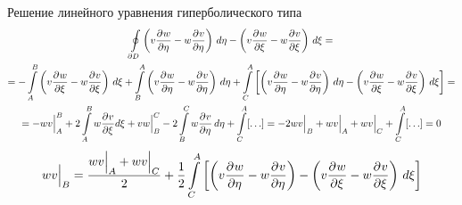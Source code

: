 \begin{example}{Решение линейного уравнения гиперболического типа}
\begin{multline*}
	\oint\limits_{\partial D}  \left(v \frac{\partial^{}w}{\partial \eta^{}} - w \frac{\partial^{}v}{\partial \eta^{}} \right) \, d\eta - \left(v \frac{\partial^{}w}{\partial \xi^{}} - w \frac{\partial^{}v}{\partial \xi^{}}\right)\, d\xi = \\ 
	= - \int\limits_A^B \left(v \frac{\partial^{}w}{\partial \xi^{}} - w \frac{\partial^{}v}{\partial \xi^{}} \right)\, d\xi + \int\limits_B^A \left(v \frac{\partial^{}w}{\partial \eta^{}} - w \frac{\partial^{}v}{\partial \eta^{}} \right)\, d\eta + \int\limits_C^A \left[\left(v \frac{\partial^{}w}{\partial \eta^{}} - w \frac{\partial^{}v}{\partial \eta^{}} \right)\, d\eta - \left(v \frac{\partial^{}w}{\partial \xi^{}} - w \frac{\partial^{}v}{\partial \xi^{}} \right)\, d\xi \right] = \\
	= - wv \Big|_A^B + 2 \int\limits_A^B w \frac{\partial^{}v}{\partial \xi^{}} d \xi + v w \Big|_B^C - 2 \int\limits_B^C w \frac{\partial^{}v}{\partial \eta^{}}\, d\eta + \int\limits_C^A [\ldots] = -2 w v\Big|_B + w v\Big|_A + w v\Big|_C + \int\limits_C^A [\ldots] = 0
\end{multline*}
\[
	w v\Big|_B = \frac{wv\Big|_A + w v\Big|_C}{2} + \frac{1}{2} \int\limits_C^A \left[ \left(v \frac{\partial^{}w}{\partial \eta^{}} - w \frac{\partial^{}v}{\partial \eta^{}} \right) - \left(v \frac{\partial^{}w}{\partial \xi^{}} - w \frac{\partial^{}v}{\partial \xi^{}} \right)\, d\xi\right]
\]




\end{example}
